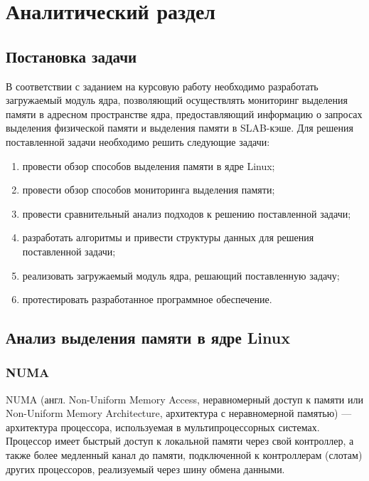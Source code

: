\section{Аналитический раздел}

\subsection{Постановка задачи}

В соответствии с заданием на курсовую работу необходимо разработать загружаемый модуль ядра, позволяющий осуществлять мониторинг выделения памяти в адресном пространстве ядра, предоставляющий информацию о запросах выделения физической памяти и выделения памяти в SLAB-кэше.
Для решения поставленной задачи необходимо решить следующие задачи:
\begin{enumerate}
    \item провести обзор способов выделения памяти в ядре Linux;
    \item провести обзор способов мониторинга выделения памяти;
    \item провести сравнительный анализ подходов к решению поставленной задачи;
    \item разработать алгоритмы и привести структуры данных для решения поставленной задачи;
    \item реализовать загружаемый модуль ядра, решающий поставленную задачу;
    \item протестировать разработанное программное обеспечение.
\end{enumerate}

\subsection{Анализ выделения памяти в ядре Linux}

\subsubsection{NUMA}

NUMA (англ. Non-Uniform Memory Access, неравномерный доступ к памяти или Non-Uniform Memory Architecture, архитектура с неравномерной памятью) --- архитектура процессора, используемая в мультипроцессорных системах.
Процессор имеет быстрый доступ к локальной памяти через свой контроллер, а также более медленный канал до памяти, подключенной к контроллерам (слотам) других процессоров, реализуемый через шину обмена данными.~\cite{mem}


